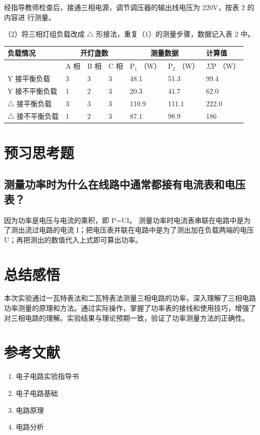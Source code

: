 \documentclass{article}
\begin{document}
经指导教师检查后，接通三相电源，调节调压器的输出线电压为 220V，按表 2 的内容进
行测量。

（2）将三相灯组负载改成 $\triangle$ 形接法，重复（1）的测量步骤，数据记入表 2 中。

\begin{tabular}{|l|l|l|l|l|l|l|}
\hline \multirow{2}{*}{负载情况} & \multicolumn{3}{|c|}{开灯盏数} & \multicolumn{2}{|c|}{测量数据} & 计算值 \\
\hline & A 相 & B 相 & C 相 & $\mathrm{P}_1$ （W） & $\mathrm{P}_2$ （W） & $\Sigma \mathrm{P}$ （W） \\
\hline Y 接平衡负载 & 3 & 3 & 3 &48.1 &51.3 &99.4 \\
\hline Y 接不平衡负载 & 1 & 2 & 3 & 20.3& 41.7& 62.0\\
\hline $\triangle$ 接平衡负载 & 3 & 3 & 3 &110.9 &111.1 &222.0 \\
\hline $\triangle$ 接不平衡负载 & 1 & 2 & 3 & 87.1&98.9 &186 \\
\hline
\end{tabular}

\section{预习思考题 }


\subsection{测量功率时为什么在线路中通常都接有电流表和电压表？  }

因为功率是电压与电流的乘积，即 P=UI。
测量功率时电流表串联在电路中是为了测出流过电路的电流 I；把电压表并联在电路中是为了测出加在负载两端的电压 U；再把测出的数值代入上式即可算出功率。


\section{总结感悟 }
本次实验通过一瓦特表法和二瓦特表法测量三相电路的功率，深入理解了三相电路功率测量的原理和方法。通过实际操作，掌握了功率表的接线和使用技巧，增强了对三相电路的理解。实验结果与理论预期一致，验证了功率测量方法的正确性。

\section{参考文献}
\begin{enumerate}
    \item 电子电路实验指导书
    \item 电子电路基础
    \item 电路原理
    \item 电路分析
\end{enumerate} 
\end{document}
